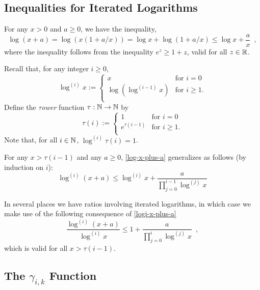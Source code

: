 \documentclass[kpfonts]{patmorin}
\theoremstyle{named}
\begin{document}
\subsection{Inequalities for Iterated Logarithms}

For any $x> 0$ and $a\ge 0$, we have the inequality,
\begin{equation}
    \log (x+a) = \log (x(1+a/x)) = \log x + \log(1+a/x)
    \le \log x + \frac{a}{x} \enspace , \label{log-x-plus-a}
\end{equation}
where the inequality follows from the inequality $e^z \ge 1+z$, valid for all $z\in\mathbb{R}$.

Recall that, for any integer $i\ge 0$,
\[
    \log^{(i)} x :=
      \begin{cases}
          x & \text{for $i=0$} \\
          \log\left(\log^{(i-1)}x\right) & \text{for $i\ge 1$.} \\
      \end{cases}
\]
Define the \emph{$\tau$ower} function $\tau:\mathbb{N}\to\mathbb{N}$ by
\[
  \tau(i) :=
    \begin{cases}
        1 & \text{for $i=0$} \\
        e^{\tau(i-1)} & \text{for $i\ge 1$.} \\
    \end{cases}
\]
Note that, for all $i\in\mathbb{N}$, $\log^{(i)}\tau(i)=1$.

For any $x > \tau(i-1)$ and any $a\ge 0$, \cref{log-x-plus-a} generalizes as follows (by induction on $i$):
\begin{equation}
    \log^{(i)}(x+a) \le \log^{(i)} x + \frac{a}{\prod_{j=0}^{i-1}\log^{(j)} x} \label{logi-x-plus-a}
\end{equation}

In several places we have ratios involving iterated logarithms, in which case we make use of the following consequence of \cref{logi-x-plus-a}
\begin{equation}
    \frac{\log^{(i)} (x+a)}{\log^{(i)} x} \le 1 + \frac{a}{\prod_{j=0}^{i}\log^{(j)} x} \enspace, \label{logi-ratio}
\end{equation}
which is valid for all $x> \tau(i-1)$.

\subsection{The $\gamma_{i,k}$ Function}
\end{document}
